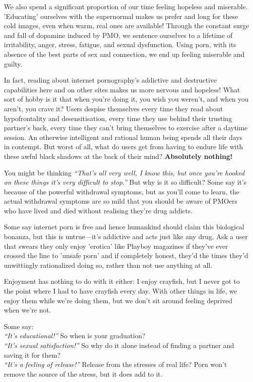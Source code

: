 \documentclass[
]{book}
\begin{document}
We also spend a significant proportion of our time feeling hopeless and miserable. 'Educating' ourselves with the supernormal makes us prefer and long for these cold images, even when warm, real ones are available! Through the constant surge and fall of dopamine induced by PMO, we sentence ourselves to a lifetime of irritability, anger, stress, fatigue, and sexual dysfunction. Using porn, with its absence of the best parts of sex and connection, we end up feeling miserable and guilty.

In fact, reading about internet pornography's addictive and destructive capabilities here and on other sites makes us more nervous and hopeless! What sort of hobby is it that when you're doing it, you wish you weren't, and when you aren't, you crave it? Users despise themselves every time they read about hypofrontality and desensitisation, every time they use behind their trusting partner's back, every time they can't bring themselves to exercise after a daytime session. An otherwise intelligent and rational human being spends all their days in contempt. But worst of all, what do users get from having to endure life with these awful black shadows at the back of their mind? \textbf{Absolutely nothing!}

You might be thinking \emph{``That's all very well, I know this, but once you're hooked on these things it's very difficult to stop.''} But why is it so difficult? Some say it's because of the powerful withdrawal symptoms, but as you'll come to learn, the actual withdrawal symptoms are so mild that you should be aware of PMOers who have lived and died without realising they're drug addicts.

Some say internet porn is free and hence humankind should claim this biological bonanza, but this is untrue---it's addictive and acts just like any drug. Ask a user that swears they only enjoy 'erotica' like Playboy magazines if they've ever crossed the line to 'unsafe porn' and if completely honest, they'd the times they'd unwittingly rationalized doing so, rather than not use anything at all.

Enjoyment has nothing to do with it either: I enjoy crayfish, but I never got to the point where I had to have crayfish every day. With other things in life, we enjoy them while we're doing them, but we don't sit around feeling deprived when we're not.

Some say:\\
\emph{``It's educational!''} So when is your graduation?\\
\emph{``It's sexual satisfaction!''} So why do it alone instead of finding a partner and saving it for them?\\
\emph{``It's a feeling of release!''} Release from the stresses of real life? Porn won't remove the source of the stress, but it does add to it.
\end{document}
